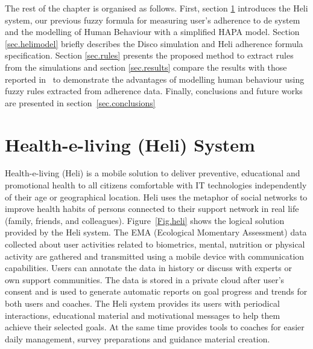 \documentclass{llncs}
\begin{document}
The rest of the chapter is organised as follows. First, section \ref{sec.heli} introduces the Heli system, our previous fuzzy formula for measuring user's adherence to de system and the modelling of Human Behaviour with a simplified HAPA model. Section \ref{sec.helimodel} briefly describes the Disco simulation and Heli adherence formula specification. Section \ref{sec.rules} presents the proposed method to extract rules from the simulations and section \ref{sec.results} compare the results with those reported in~\cite{Brailsford2016} to demonstrate the advantages of modelling human behaviour using fuzzy rules extracted from adherence data. Finally, conclusions and future works are presented in section~\ref{sec.conclusions}

\section{Health-e-living (Heli) System}
\label{sec.heli}

 Health-e-living (Heli)\cite{rem2012} is a mobile solution to deliver preventive, educational and promotional health to all citizens comfortable with IT technologies independently of their age or geographical location. Heli uses the metaphor of social networks to improve health habits of persons connected to their support network in real life (family, friends, and colleagues). Figure~\ref{Fig.heli} shows the logical solution provided by the Heli system.
 The EMA  (Ecological Momentary Assessment) data collected about user activities related to biometrics, mental, nutrition or physical activity are gathered and transmitted using a mobile device with communication capabilities. Users can annotate the data in history or discuss with experts or own support communities. The data is stored in a private cloud after user's consent and is used to generate automatic reports on goal progress and trends for both users and coaches. 
 The Heli system provides its users with periodical interactions, educational material and motivational messages to help them achieve their selected goals. At the same time provides tools to coaches for easier daily management, survey preparations and guidance material creation.
 
\end{document}
